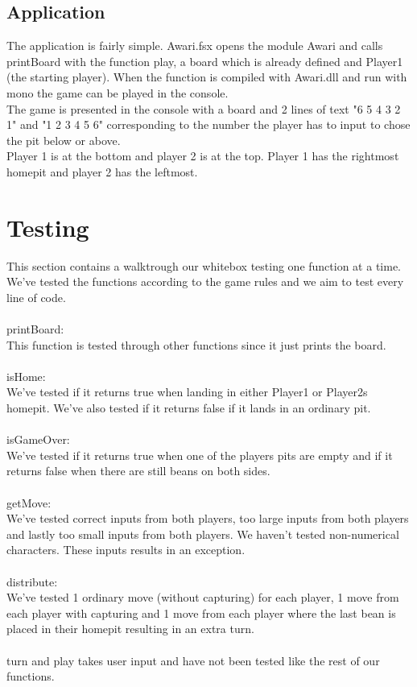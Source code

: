\documentclass{article}
\begin{document}
\subsection*{Application}
The application is fairly simple. Awari.fsx opens the module Awari and calls printBoard with the function play, a board which is already defined and Player1 (the starting player).
When the function is compiled with Awari.dll and run with mono the game can be played in the console.\\
The game is presented in the console with a board and 2 lines of text "6 5 4 3 2 1" and "1 2 3 4 5 6" corresponding to the number the player has to input to chose the pit below or above.\\
Player 1 is at the bottom and player 2 is at the top. Player 1 has the rightmost homepit and player 2 has the leftmost.
\section*{Testing}
This section contains a walktrough our whitebox testing one function at a time.
We've tested the functions according to the game rules and we aim to test every line of code.\\
\\
printBoard:\\
This function is tested through other functions since it just prints the board.\\
\\
isHome:\\
We've tested if it returns true when landing in either Player1 or Player2s homepit. We've also tested if it returns false if it lands in an ordinary pit.\\
\\
isGameOver:\\
We've tested if it returns true when one of the players pits are empty and if it returns false when there are still beans on both sides.\\
\\
getMove:\\
We've tested correct inputs from both players, too large inputs from both players and lastly too small inputs from both players. We haven't tested non-numerical characters. These inputs results in an exception.\\
\\
distribute:\\
We've tested 1 ordinary move (without capturing) for each player, 1 move from each player with capturing and 1 move from each player where the last bean is placed in their homepit resulting in an extra turn.\\
\\
turn and play takes user input and have not been tested like the rest of our functions.
\\
\lstset{xleftmargin=-50pt,xrightmargin=-50pt}
\pagebreak
\end{document}
